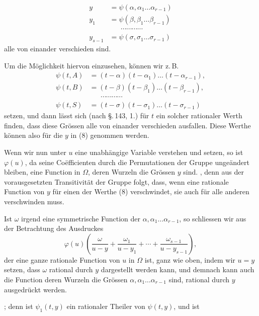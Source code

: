 \[
\begin{aligned}
y &= \psi(\alpha, \alpha_1 \ldots \alpha_{r-1}) \\
y_1 &= \psi(\beta, \beta_1 \ldots \beta_{r-1}) \\
& \phantom{=} \; \cdots\cdots\cdots\cdots \\
y_{s-1} &= \psi(\sigma, \sigma_1 \ldots \sigma_{r-1})
\end{aligned}
\tag{8}
\]
alle von einander verschieden sind.

Um die Möglichkeit hiervon einzusehen, können wir z.\,B.
\[
\begin{aligned}
\psi(t, A) &= (t - \alpha)(t - \alpha_1) \ldots (t - \alpha_{r-1}), \\
\psi(t, B) &= (t - \beta)(t - \beta_1) \ldots (t - \beta_{r-1}), \\
& \phantom{=} \; \cdots\cdots\cdots\cdots \\
\psi(t, S) &= (t - \sigma)(t - \sigma_1) \ldots (t - \sigma_{r-1})
\end{aligned}
\tag{9}
\]
setzen, und dann lässt sich (nach \S.\,143, 1.) für $t$ ein solcher
rationaler Werth finden, dass diese Grössen alle von einander
verschieden ausfallen. Diese Werthe können also für die $y$ in (8)
genommen werden.

Wenn wir nun unter $u$ eine unabhängige Variable verstehen und
setzen, so ist $\varphi(u)$, da seine Co\"efficienten durch die Permutationen
der Gruppe ungeändert bleiben, eine Function in $\Omega$, deren Wurzeln die Grössen $y$ sind. , denn
aus der vorausgesetzten Transitivität der Gruppe folgt, dass,
wenn eine rationale Function von $y$ für einen der Werthe (8)
verschwindet, sie auch für alle anderen verschwinden muss.

Ist $\omega$ irgend eine symmetrische Function der $\alpha, \alpha_1 \ldots \alpha_{r-1}$,
so schliessen wir aus der Betrachtung des Ausdruckes
\[
\varphi(u) \left( \frac{\omega}{u - y} + \frac{\omega_1}{u - y_1} + \cdots + \frac{\omega_{s-1}}{u - y_{s-1}} \right),
\]
der eine ganze rationale Function von $u$ in $\Omega$ ist, ganz wie oben,
indem wir $u = y$ setzen, dass $\omega$ rational durch $y$ dargestellt
werden kann, und demnach kann auch die Function
deren Wurzeln die Grössen $\alpha, \alpha_1 \ldots \alpha_{r-1}$ sind, rational durch
$y$ ausgedrückt werden.

; denn ist $\psi_1(t, y)$ ein rationaler Theiler
von $\psi(t, y)$, und ist
